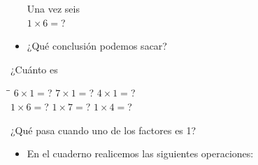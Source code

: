 \documentclass[10pt,twoside]{article}
\begin{document}
\begin{itemize}
\begin{minipage}{.45\textwidth}
Una vez seis\\
$1\times 6=$?
\end{minipage}
\begin{minipage}{.3\textwidth}
\end{minipage}
\item ¿Qué conclusión podemos sacar?
\end{itemize}
¿Cuánto es

\begin{minipage}{.6\textwidth}
\begin{tabbing}
\hspace{2.5cm}\=\hspace{2.5cm}\=\kill
 $6\times 1=$? \> $7\times 1=$? \> $4\times 1=$?\\
 $1\times 6=$? \> $1\times 7=$? \> $1\times 4=$?
\end{tabbing} 
\end{minipage}\hfill
\begin{minipage}{.35\textwidth}
¿Qué pasa cuando uno de los
factores es 1?
\end{minipage}
\begin{itemize}
\item En el cuaderno realicemos las siguientes operaciones:

\end{itemize}
\end{document}
